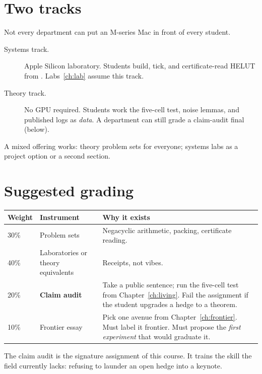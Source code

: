 \section{Two tracks}

Not every department can put an M-series Mac in front of every student.

\begin{description}
  \item[Systems track.]
        Apple Silicon laboratory.
        Students build, tick, and certificate-read HELUT from
        .
        Labs~\ref{ch:lab} assume this track.
  \item[Theory track.]
        No GPU required.
        Students work the five-cell test, noise lemmas, and published logs as
        \emph{data}.
        A department can still grade a claim-audit final (below).
\end{description}

A mixed offering works: theory problem sets for everyone; systems labs as a
project option or a second section.

\section{Suggested grading}

\begin{center}
\begin{tabular}{@{}lp{}p{}@{}}
\toprule
Weight & Instrument & Why it exists \\
\midrule
30\% & Problem sets & Negacyclic arithmetic, packing, certificate reading. \\
40\% & Laboratories or theory equivalents & Receipts, not vibes. \\
20\% & \textbf{Claim audit} & Take a public sentence; run the five-cell test
from Chapter~\ref{ch:living}. Fail the assignment if the student upgrades a
hedge to a theorem. \\
10\% & Frontier essay & Pick one avenue from Chapter~\ref{ch:frontier}.
Must label it frontier. Must propose the \emph{first experiment} that would
graduate it. \\
\bottomrule
\end{tabular}
\end{center}

The claim audit is the signature assignment of this course.
It trains the skill the field currently lacks: refusing to launder an
open hedge into a keynote.

